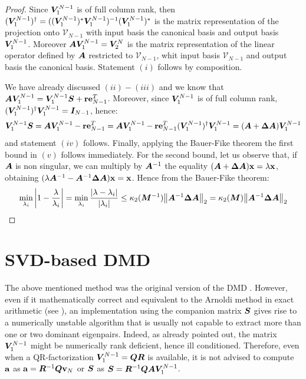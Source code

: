 \begin{proof}
Since $\vb*{V}_1^{N-1}$ is of full column rank, then $(\vb*{V}_1^{N-1})^{\dagger} = ((\vb*{V}_1^{N-1})^{*}\vb*{V}_1^{N-1})^{-1}(\vb*{V}_1^{N-1})^{*}$ is the matrix representation of the projection onto $\mathcal{V}_{N-1}$ with input basis the canonical basis and output basis $\vb*{V}_1^{N-1}$. Moreover $\vb*{A}\vb*{V}_1^{N-1} = \vb*{V}_2^{N}$ is the matrix representation of the linear operator defined by $\vb*{A}$ restricted to $\mathcal{V}_{N-1}$, whit input basis $\mathcal{V}_{N-1}$ and output basis the canonical basis. Statement $(i)$ follows by composition.

We have already discussed $(ii)-(iii)$ and we know that $\vb*{A}\vb*{V}_1^{N-1}  = \vb*{V}_1^{N-1}\vb*{S} + \vb{r}\vb{e}_{N-1}^T$. Moreover, since $\vb*{V}_1^{N-1}$ is of full column rank, $(\vb*{V}_1^{N-1})^{\dagger}\vb*{V}_1^{N-1} = \vb*{I}_{N-1}$, hence:
\begin{equation*}
    \vb*{V}_1^{N-1}\vb*{S} = \vb*{A}\vb*{V}_1^{N-1} - \vb{r}\vb{e}_{N-1}^T = \vb*{A}\vb*{V}_1^{N-1} - \vb{r}\vb{e}_{N-1}^T (\vb*{V}_1^{N-1})^{\dagger}\vb*{V}_1^{N-1}  = (\vb*{A} + \vb*{\Delta A})\vb*{V}_1^{N-1} 
\end{equation*}
and statement $(iv)$ follows. Finally, applying the Bauer-Fike theorem \cite{golub_matrix_2013} the first bound in $(v)$ follows immediately. For the second bound, let us observe that, if $\vb*{A}$ is non singular, we can multiply by $\vb*{A}^{-1}$ the equality $(\vb*{A} + \vb*{\Delta A})\vb{x} = \lambda \vb{x}$, obtaining $(\lambda \vb*{A}^{-1}  - \vb*{A}^{-1}\vb*{\Delta A})\vb{x} = \vb{x}$. Hence from the Bauer-Fike theorem:
\begin{equation*}
    \min_{\lambda_i}\abs{1 - \frac{\lambda}{\lambda_i}} = \min_{\lambda_i}\frac{\abs{\lambda - \lambda_i}}{\abs{\lambda_i}} \leq  \kappa_2(\vb*{M}^{-1})\norm{\vb*{A}^{-1}\vb*{\Delta A}}_2 = \kappa_2(\vb*{M})\norm{\vb*{A}^{-1}\vb*{\Delta A}}_2
\end{equation*}
\end{proof}

\section{SVD-based DMD}
The above mentioned method was the original version of the DMD \cite{schmid_dynamic_2010}. However, even if it mathematically correct and equivalent to the Arnoldi method in exact arithmetic (see ), an implementation using the companion matrix $\vb*{S}$ gives rise to a numerically unstable algorithm that is usually not capable to extract more than one or two dominant eigenpairs. Indeed, as already pointed out, the matrix $\vb*{V}_1^{N-1}$ might be numerically rank deficient, hence ill conditioned. Therefore, even when a QR-factorization $\vb*{V}_1^{N-1} = \vb*{Q}\vb*{R}$ is available, it is not advised to compute $\vb{a}$ as $\vb{a} = \vb*{R}^{-1}\vb*{Q}\vb{v}_N$ or $\vb*{S}$ as $\vb*{S} = \vb*{R}^{-1}\vb*{Q}\vb*{A}\vb*{V}_1^{N-1}$. 

